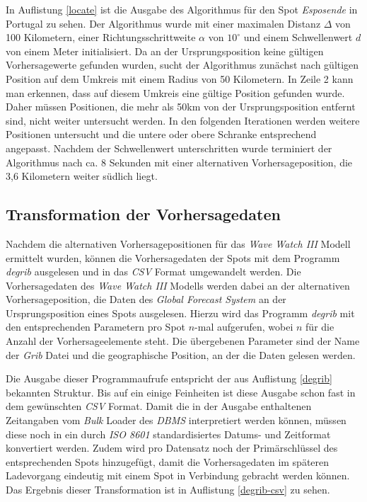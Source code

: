 

In Auflistung \ref{locate} ist die Ausgabe des Algorithmus für den
Spot \textit{Esposende} in Portugal zu sehen. Der Algorithmus wurde
mit einer maximalen Distanz $\Delta$ von 100 Kilometern, einer
Richtungsschrittweite $\alpha$ von $10^{\circ}$ und einem
Schwellenwert $d$ von einem Meter initialisiert. Da an der
Ursprungsposition keine gültigen Vorhersagewerte gefunden wurden,
sucht der Algorithmus zunächst nach gültigen Position auf dem Umkreis
mit einem Radius von 50 Kilometern. In Zeile 2 kann man erkennen, dass
auf diesem Umkreis eine gültige Position gefunden wurde. Daher müssen
Positionen, die mehr als 50km von der Ursprungsposition entfernt sind,
nicht weiter untersucht werden. In den folgenden Iterationen werden
weitere Positionen untersucht und die untere oder obere Schranke
entsprechend angepasst. Nachdem der Schwellenwert unterschritten wurde
terminiert der Algorithmus nach ca. 8 Sekunden mit einer alternativen
Vorhersageposition, die 3,6 Kilometern weiter südlich liegt. 

\subsection{Transformation der Vorhersagedaten}
Nachdem die alternativen Vorhersagepositionen für das \textit{Wave
  Watch III} Modell ermittelt wurden, können die Vorhersagedaten der
Spots mit dem Programm \textit{degrib} ausgelesen und in das
\textit{CSV} Format umgewandelt werden. Die Vorhersagedaten des
\textit{Wave Watch III} Modells werden dabei an der alternativen
Vorhersageposition, die Daten des \textit{Global Forecast System} an
der Ursprungsposition eines Spots ausgelesen. Hierzu wird das Programm
\textit{degrib} mit den entsprechenden Parametern pro Spot $n$-mal
aufgerufen, wobei $n$ für die Anzahl der Vorhersageelemente steht. Die
übergebenen Parameter sind der Name der \textit{Grib} Datei und die
geographische Position, an der die Daten gelesen werden.

Die Ausgabe dieser Programmaufrufe entspricht der aus Auflistung
\ref{degrib} bekannten Struktur. Bis auf ein einige Feinheiten ist
diese Ausgabe schon fast in dem gewünschten \textit{CSV} Format. Damit
die in der Ausgabe enthaltenen Zeitangaben vom \textit{Bulk} Loader
des \textit{DBMS} interpretiert werden können, müssen diese noch in
ein durch \textit{ISO 8601} standardisiertes Datums- und Zeitformat
konvertiert werden. Zudem wird pro Datensatz noch der Primärschlüssel
des entsprechenden Spots hinzugefügt, damit die Vorhersagedaten im
späteren Ladevorgang eindeutig mit einem Spot in Verbindung gebracht
werden können. Das Ergebnis dieser Transformation ist in Auflistung
\ref{degrib-csv} zu sehen.


